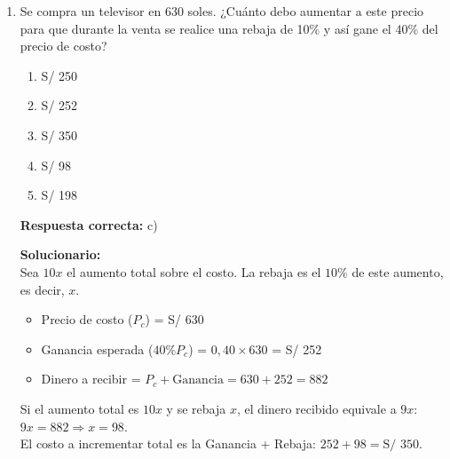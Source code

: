 \begin{enumerate}
\textbf{Respuesta correcta:} c)

\vspace{2mm}
\textbf{Solucionario:}\\
Número de monedas por fila ($f$):\\
Fila 1: $1 \times 1 = 1^2$\\
Fila 2: $2 \times 2 = 2^2$\\
Fila 3: $3 \times 3 = 3^2$\\
Total para 20 filas:\\
$\sum_{i=1}^{20} i^2 = \frac{n(n+1)(2n+1)}{6}$\\
$S = \frac{20(21)(41)}{6} = 10(7)(41) = $

\vspace{6mm}


\item Se compra un televisor en 630 soles. ¿Cuánto debo aumentar a este precio para que durante la venta se realice una rebaja de 10\% y así gane el 40\% del precio de costo?

\begin{enumerate}[label=\alph*)]
	\item S/ 250
	\item S/ 252
	\item S/ 350
	\item S/ 98
	\item S/ 198
\end{enumerate}

\textbf{Respuesta correcta:} c)

\vspace{2mm}
\textbf{Solucionario:}\\
Sea $10x$ el aumento total sobre el costo. La rebaja es el $10\%$ de este aumento, es decir, $x$.
\begin{itemize}
	\item Precio de costo ($P_c$) = S/ 630
	\item Ganancia esperada ($40\% P_c$) = $0,40 \times 630$ = S/ 252
	\item Dinero a recibir = $P_c + \text{Ganancia} = 630 + 252 = 882$
\end{itemize}
Si el aumento total es $10x$ y se rebaja $x$, el dinero recibido equivale a $9x$:\\
$9x = 882 \Rightarrow x = 98$.\\
El costo a incrementar total es la Ganancia + Rebaja: $252 + 98 = \text{S/ 350}$.\\

\vspace{6mm}


\end{enumerate}
